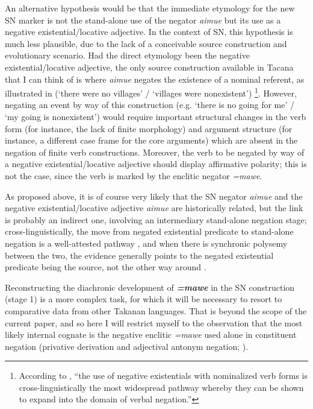 \documentclass[output=paper]{langsci/langscibook}
\begin{document}
An alternative hypothesis would be that the immediate etymology for the new
SN marker is not the stand-alone use of the negator \textit{aimue} but its
use as a negative existential\slash locative adjective. In the context of
SN, this hypothesis is much less plausible, due to the lack of a
conceivable source construction and evolutionary scenario. Had the direct
etymology been the negative existential\slash locative adjective, the only
source construction available in Tacana that I can think of is where
\textit{aimue} negates the existence of a nominal referent, as illustrated
in  (`there were no villages' \slash{} `villages were nonexistent') \footnote{\label{fn:tacana_crossling}According to \textcite[157]{Veselinova2016}, ``the use of
negative existentials with nominalized verb forms is cross-linguistically
the most widespread pathway whereby they can be shown to expand into the
domain of verbal negation.''}.
However, negating an event by way of this construction (e.g. `there
is no going for me' \slash{}  `my going is nonexistent') would require important
structural changes in the verb form (for instance, the lack of finite
morphology) and argument structure (for instance, a different case frame
for the core arguments) which are absent in the negation of finite verb
constructions. Moreover, the verb to be negated by way of a negative
existential\slash locative adjective should display affirmative polarity;
this is not the case, since the verb is marked by the enclitic negator
\textit{=mawe}.

As proposed above, it is of course very likely that the SN negator
\textit{aimue} and the negative existential\slash locative adjective
\textit{aimue} are historically related, but the link is probably an
indirect one, involving an intermediary stand-alone negation stage;
cross-linguistically, the move from negated existential predicate to
stand-alone negation is a well-attested pathway 
\parencites[10,
13--14]{Croft1991}[127ff]{Veselinova2013}[155--156]{Veselinova2016},
and when there is synchronic polysemy between the two, the evidence
generally points to the negated existential predicate being the source, not
the other way around \citep[8]{Croft1991}.

Reconstructing the diachronic development of \textbf{\textit{=mawe}} in the
SN construction (stage 1) is a more complex task, for which it will be
necessary to resort to comparative data from other Takanan languages. That 
is beyond the scope of the current paper, and so here I will restrict
myself to the observation that the most likely internal cognate is the
negative
enclitic \textit{=mawe} used alone in constituent negation (privative
derivation and adjectival antonym negation; ).
\end{document}
